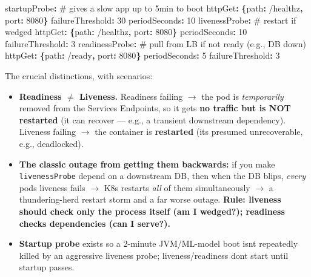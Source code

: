 \documentclass[11pt]{article}
\providecommand{\tightlist}{\setlength{\itemsep}{1pt}\setlength{\parskip}{0pt}}
\newenvironment{Shaded}{\begin{snugshade}}{\end{snugshade}}
\newcommand{\AttributeTok}[1]{\textcolor[rgb]{0.16,0.50,0.73}{#1}}
\newcommand{\CommentTok}[1]{\textcolor[rgb]{0.48,0.49,0.49}{#1}}
\newcommand{\DecValTok}[1]{\textcolor[rgb]{0.96,0.45,0.00}{#1}}
\newcommand{\FunctionTok}[1]{\textcolor[rgb]{0.56,0.27,0.68}{#1}}
\newcommand{\KeywordTok}[1]{\textcolor[rgb]{0.81,0.81,0.76}{\textbf{#1}}}
\begin{document}
\begin{Shaded}
\begin{Highlighting}[]
\FunctionTok{startupProbe}\KeywordTok{:}\CommentTok{                       \# gives a slow app up to 5min to boot}
\AttributeTok{  }\FunctionTok{httpGet}\KeywordTok{:}\AttributeTok{ }\KeywordTok{\{}\FunctionTok{path}\KeywordTok{:}\AttributeTok{ /healthz}\KeywordTok{,}\AttributeTok{ }\FunctionTok{port}\KeywordTok{:}\AttributeTok{ }\DecValTok{8080}\KeywordTok{\}}
\AttributeTok{  }\FunctionTok{failureThreshold}\KeywordTok{:}\AttributeTok{ }\DecValTok{30}
\AttributeTok{  }\FunctionTok{periodSeconds}\KeywordTok{:}\AttributeTok{ }\DecValTok{10}
\FunctionTok{livenessProbe}\KeywordTok{:}\CommentTok{                      \# restart if wedged}
\AttributeTok{  }\FunctionTok{httpGet}\KeywordTok{:}\AttributeTok{ }\KeywordTok{\{}\FunctionTok{path}\KeywordTok{:}\AttributeTok{ /healthz}\KeywordTok{,}\AttributeTok{ }\FunctionTok{port}\KeywordTok{:}\AttributeTok{ }\DecValTok{8080}\KeywordTok{\}}
\AttributeTok{  }\FunctionTok{periodSeconds}\KeywordTok{:}\AttributeTok{ }\DecValTok{10}
\AttributeTok{  }\FunctionTok{failureThreshold}\KeywordTok{:}\AttributeTok{ }\DecValTok{3}
\FunctionTok{readinessProbe}\KeywordTok{:}\CommentTok{                     \# pull from LB if not ready (e.g., DB down)}
\AttributeTok{  }\FunctionTok{httpGet}\KeywordTok{:}\AttributeTok{ }\KeywordTok{\{}\FunctionTok{path}\KeywordTok{:}\AttributeTok{ /ready}\KeywordTok{,}\AttributeTok{ }\FunctionTok{port}\KeywordTok{:}\AttributeTok{ }\DecValTok{8080}\KeywordTok{\}}
\AttributeTok{  }\FunctionTok{periodSeconds}\KeywordTok{:}\AttributeTok{ }\DecValTok{5}
\AttributeTok{  }\FunctionTok{failureThreshold}\KeywordTok{:}\AttributeTok{ }\DecValTok{3}
\end{Highlighting}
\end{Shaded}

The crucial distinctions, with scenarios:

\begin{itemize}
\tightlist
\item
  \textbf{Readiness \(\neq\) Liveness.} Readiness failing \(\rightarrow\) the pod is \emph{temporarily} removed from the Service\textquotesingle s Endpoints, so it gets \textbf{no traffic but is NOT restarted} (it can recover --- e.g., a transient downstream dependency). Liveness failing \(\rightarrow\) the container is \textbf{restarted} (it\textquotesingle s presumed unrecoverable, e.g., deadlocked).
\item
  \textbf{The classic outage from getting them backwards:} if you make \texttt{livenessProbe} depend on a downstream DB, then when the DB blips, \emph{every} pod\textquotesingle s liveness fails \(\rightarrow\) K8s restarts \emph{all} of them simultaneously \(\rightarrow\) a thundering-herd restart storm and a far worse outage. \textbf{Rule: liveness should check only the process itself (am I wedged?); readiness checks dependencies (can I serve?).}
\item
  \textbf{Startup probe} exists so a 2-minute JVM/ML-model boot isn\textquotesingle t repeatedly killed by an aggressive liveness probe; liveness/readiness don\textquotesingle t start until startup passes.
\end{itemize}
\end{document}
